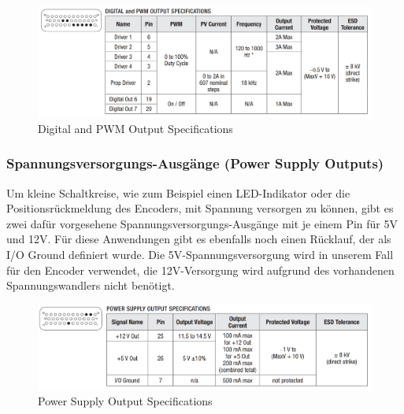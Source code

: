 \begin{figure}[H]
	\begin{center}
		\includegraphics[width=\textwidth]{figures/antrieb/Digital_PWM_Output_Specifications.png}
		\caption{Digital and PWM Output Specifications}
	\end{center}
\end{figure}



\subsubsection{Spannungsversorgungs-Ausgänge (Power Supply Outputs)}
Um kleine Schaltkreise, wie zum Beispiel einen LED-Indikator oder die Positionsrückmeldung des Encoders, mit Spannung versorgen zu können, gibt es zwei dafür vorgesehene Spannungsversorgungs-Ausgänge mit je einem Pin für 5V und 12V. Für diese Anwendungen gibt es ebenfalls noch einen Rücklauf, der als I/O Ground definiert wurde. Die 5V-Spannungsversorgung wird in unserem Fall für den Encoder verwendet, die 12V-Versorgung wird aufgrund des vorhandenen Spannungswandlers nicht benötigt.

\begin{figure}[H]
	\begin{center}
		\includegraphics[width=\textwidth]{figures/antrieb/Power_Supply_Output_Specifications.png}
		\caption{Power Supply Output Specifications}
	\end{center}
\end{figure}


\newpage


